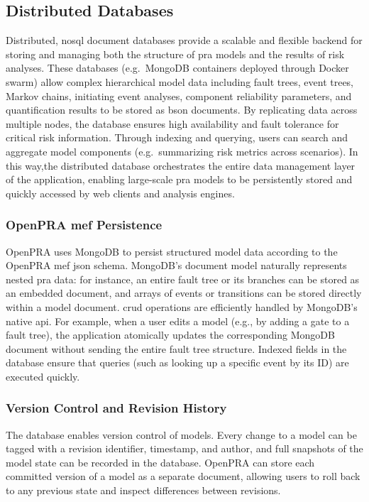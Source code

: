 \subsection{Distributed Databases}

Distributed, \acrshort{nosql} document databases provide a scalable and flexible backend for storing and managing both the structure of \acrshort{pra} models and the results of risk analyses. These databases (e.g.\ MongoDB containers deployed through Docker swarm) allow complex hierarchical model data including fault trees, event trees, Markov chains, initiating event analyses, component reliability parameters, and quantification results to be stored as \acrshort{bson} documents. By replicating data across multiple nodes, the database ensures high availability and fault tolerance for critical risk information. Through indexing and querying, users can search and aggregate model components (e.g.\ summarizing risk metrics across scenarios). In this way,the distributed database orchestrates the entire data management layer of the application, enabling large-scale \acrshort{pra} models to be persistently stored and quickly accessed by web clients and analysis engines.

\subsubsection{OpenPRA \acrshort{mef} Persistence}

OpenPRA uses MongoDB to persist structured model data according to the OpenPRA \acrshort{mef} \acrshort{json} schema. MongoDB’s document model naturally represents nested \acrshort{pra} data: for instance, an entire fault tree or its branches can be stored as an embedded document, and arrays of events or transitions can be stored directly within a model document. \acrshort{crud} operations are efficiently handled by MongoDB’s native \acrshort{api}. For example, when a user edits a model (e.g., by adding a gate to a fault tree), the application atomically updates the corresponding MongoDB document without sending the entire fault tree structure. Indexed fields in the database ensure that queries (such as looking up a specific event by its ID) are executed quickly.

\subsubsection{Version Control and Revision History}

The database enables version control of models. Every change to a model can be tagged with a revision identifier, timestamp, and author, and full snapshots of the model state can be recorded in the database. OpenPRA can store each committed version of a model as a separate document, allowing users to roll back to any previous state and inspect differences between revisions.

